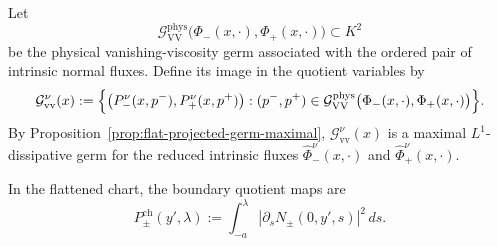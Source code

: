 \documentclass[11pt]{amsart}
\numberwithin{equation}{section}
\theoremstyle{plain}
\theoremstyle{definition}
\theoremstyle{remark}
\begin{document}
Let
\[
    \mathcal G_{\mathrm{VV}}^{\mathrm{phys}}
    \bigl(\Phi_-(x,\cdot),\Phi_+(x,\cdot)\bigr)
    \subset K^2
\]
be the physical vanishing-viscosity germ associated with the ordered pair of
intrinsic normal fluxes. Define its image in the quotient variables by
\begin{equation}
\label{eq:general-intrinsic-projected-germ}
\begin{aligned}
    \mathcal G_{\mathrm{vv}}^\nu(x)
    :=
    \Bigl\{
        \bigl(
            P_-^\nu(x,p^-),
            P_+^\nu(x,p^+)
        \bigr):
        (p^-,p^+)
        \in
        \mathcal G_{\mathrm{VV}}^{\mathrm{phys}}
        \bigl(\Phi_-(x,\cdot),\Phi_+(x,\cdot)\bigr)
    \Bigr\}.
\end{aligned}
\end{equation}
By Proposition~\ref{prop:flat-projected-germ-maximal},
\(\mathcal G_{\mathrm{vv}}^\nu(x)\) is a maximal
\(L^1\)-dissipative germ for the reduced intrinsic fluxes
\(\widehat\Phi_-^\nu(x,\cdot)\) and
\(\widehat\Phi_+^\nu(x,\cdot)\).

In the flattened chart, the boundary quotient maps are
\begin{equation}
\label{eq:general-chart-boundary-quotients}
    P_\pm^{\mathrm{ch}}(y',\lambda)
    :=
    \int_{-a}^{\lambda}
        \left|
            \partial_s N_\pm(0,y',s)
        \right|^2
    \,ds.
\end{equation}
\end{document}
